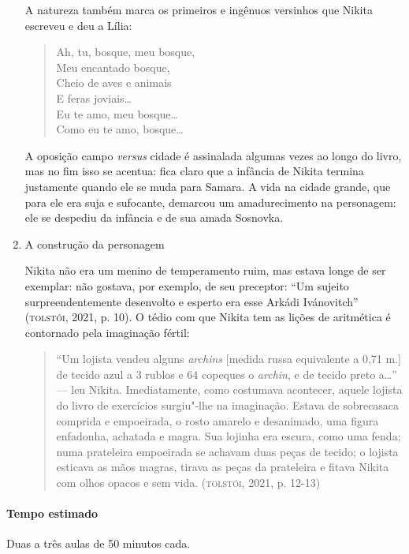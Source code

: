 \documentclass[11pt]{extarticle}
\begin{document}
\begin{enumerate}
A natureza também marca os primeiros e ingênuos versinhos que Nikita
escreveu e deu a Lília:

\begin{verse}
Ah, tu, bosque, meu bosque,\\
Meu encantado bosque,\\
Cheio de aves e animais\\
E feras joviais\ldots{}\\
Eu te amo, meu bosque\ldots{}\\
Como eu te amo, bosque\ldots{}
\end{verse}

A oposição campo \emph{versus} cidade é assinalada algumas vezes ao
longo do livro, mas no fim isso se acentua: fica claro que a infância de
Nikita termina justamente quando ele se muda para Samara. A vida na
cidade grande, que para ele era suja e sufocante, demarcou um
amadurecimento na personagem: ele se despediu da infância e de sua amada
Sosnovka.

\item
A construção da personagem

Nikita não era um menino de temperamento ruim, mas estava longe de ser
exemplar: não gostava, por exemplo, de seu preceptor: ``Um sujeito
surpreendentemente desenvolto e esperto era esse Arkádi Ivánovitch''
(\textsc{tolstói}, 2021, p. 10). O tédio com que Nikita tem as lições de
aritmética é contornado pela imaginação fértil:

\begin{quote}
``Um lojista vendeu alguns \emph{archins} {[}medida russa equivalente a
0,71 m.{]} de tecido azul a 3 rublos e 64 copeques o \emph{archin}, e de
tecido preto a\ldots{}'' --- leu Nikita. Imediatamente, como costumava
acontecer, aquele lojista do livro de exercícios surgiu"-lhe na
imaginação. Estava de sobrecasaca comprida e empoeirada, o rosto amarelo
e desanimado, uma figura enfadonha, achatada e magra. Sua lojinha era
escura, como uma fenda; numa prateleira empoeirada se achavam duas peças
de tecido; o lojista esticava as mãos magras, tirava as peças da
prateleira e fitava Nikita com olhos opacos e sem vida.
(\textsc{tolstói}, 2021, p. 12-13)
\end{quote}
\end{enumerate}

\paragraph{Tempo estimado} Duas a três aulas de 50 minutos cada.
\end{document}
